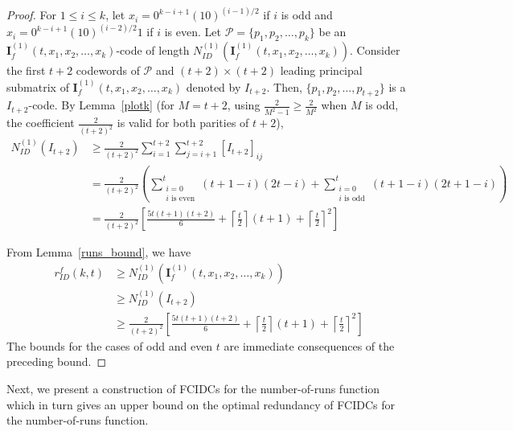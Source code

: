 \documentclass[11 pt]{article}
\numberwithin{equation}{section}
\begin{document}
    \begin{proof}
         For $1 \leq i \leq k$, let $x_i = 0^{k-i+1}(10)^{(i-1)/2}$ if $i$ is odd and $x_i = 0^{k-i+1}(10)^{(i-2)/2}1$ if $i$ is even. Let $\mathcal{P} = \{p_1, p_2, \ldots, p_k\}$ be an $\bm{I}_f^{(1)}(t, x_1,x_2,\dots,x_k)$-code of length $N^{(1)}_{ID}(\bm{I}_f^{(1)}(t, x_1,x_2,\dots,x_k))$. Consider the first $t+2$ codewords of $\mathcal{P}$ and $(t+2) \times (t+2)$ leading principal submatrix of $\bm{I}_f^{(1)}(t, x_1,x_2,\dots,x_k)$ denoted by $I_{t+2}.$
         Then, $\{p_1, p_2, \ldots, p_{t+2}\}$ is a $I_{t+2}$-code. By Lemma~\ref{plotk} (for $M = t+2$, using $\tfrac{2}{M^2-1} \ge \tfrac{2}{M^2}$ when $M$ is odd, the coefficient $\tfrac{2}{(t+2)^2}$ is valid for both parities of $t+2$),
         {
            \begin{align*}
             N_{ID}^{(1)}(I_{t+2}) &\geq \frac{2}{(t+2)^2}\sum_{i = 1}^{t+2}\sum_{j= i+1}^{t+2}[I_{t+2}]_{ij}\\
                              & =   \frac{2}{(t+2)^2}\left(\sum_{\substack{i=0 \\ i \text{ is even}}}^{t}(t+1 - i)(2t - i) + \sum_{\substack{i=0 \\ i \text{ is odd}}}^{t}(t+1 - i)(2t + 1- i)\right)\\ 
                              & = \frac{2}{(t+2)^2} \left [ \frac{5t(t+1)(t+2)}{6} + \left \lceil\frac{t}{2} \right \rceil (t+1) + \left \lceil\frac{t}{2} \right \rceil^2\right]                             
         \end{align*}
         }
         
         From Lemma~\ref{runs_bound}, we have
         {
            \begin{align*}
             r_{ID}^f(k,t) &\geq N^{(1)}_{ID}(\bm{I}_f^{(1)}(t, x_1,x_2,\dots,x_k))\\[3pt]
             &\geq N_{ID}^{(1)}(I_{t+2})\\[3pt]
             &\geq \frac{2}{(t+2)^2} \left [ \frac{5t(t+1)(t+2)}{6} + \left \lceil\frac{t}{2} \right \rceil (t+1) + \left \lceil\frac{t}{2} \right \rceil^2\right]
         \end{align*}
         }         
         The bounds for the cases of odd and even $t$ are immediate consequences of the preceding bound.
    \end{proof}
    Next, we present a construction of FCIDCs for the number-of-runs function which in turn gives an upper bound on the optimal redundancy of FCIDCs for the number-of-runs function.
    
\end{document}
